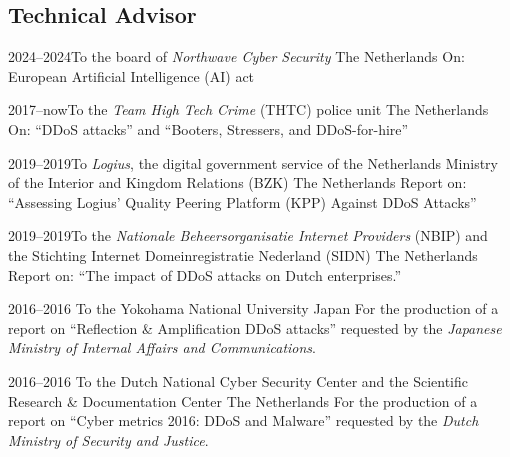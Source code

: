 \documentclass[print]{styles/friggeri-cv-mac} %
\begin{document}
\subsection{Technical Advisor}\vspace{-5pt}
\begin{entrylist}
	
	\entry
	{2024--2024}{To the board of \textit{Northwave Cyber Security}}
	{The Netherlands}
	{On: European Artificial Intelligence (AI) act}
	
	\entry
	{2017--now}{To the \textit{Team High Tech Crime} (THTC) police unit}
	{The Netherlands}
	{On: ``DDoS attacks'' and ``Booters, Stressers, and DDoS-for-hire''}
	
	\entry
	{2019--2019}{To \textit{Logius}, the digital government service of the Netherlands Ministry of the Interior and Kingdom Relations (BZK)}
	{The Netherlands}
	{Report on: ``Assessing Logius' Quality Peering Platform (KPP) Against DDoS Attacks''}
	
	\entry
	{2019--2019}{To the \textit{Nationale Beheersorganisatie Internet Providers} (NBIP) and the Stichting Internet Domeinregistratie Nederland (SIDN)}
	{The Netherlands}
	{Report on: ``The impact of DDoS attacks on Dutch enterprises.''}
	
	\entry
	{2016--2016}
	{To the Yokohama National University}
	{Japan}
	{For the production of a report on ``Reflection \& Amplification DDoS attacks''
		requested by the \emph{Japanese Ministry of Internal Affairs and
			Communications}.}
	
	\entry
	{2016--2016}
	{To the Dutch National Cyber Security Center and the Scientific Research \& Documentation Center}
	{The Netherlands}
	{For the production of a report on ``Cyber metrics 2016: DDoS and Malware'' requested by the \emph{Dutch Ministry of Security and Justice}.} 
	
\end{entrylist}

\end{document}
